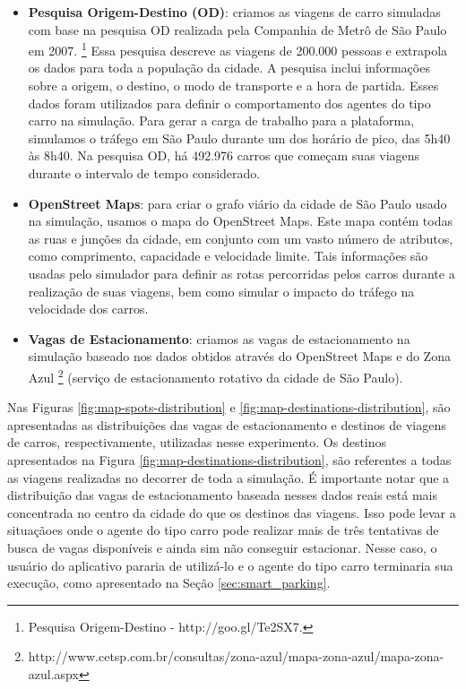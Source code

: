 \begin{itemize}
    \item \textbf{Pesquisa Origem-Destino (OD)}: criamos as viagens de carro simuladas com base na pesquisa OD realizada pela Companhia de Metrô de São Paulo em 2007.
        \footnote{Pesquisa Origem-Destino - http://goo.gl/Te2SX7.}
        Essa pesquisa descreve as viagens de 200.000 pessoas e extrapola os dados para toda a população da cidade.
        A pesquisa inclui informações sobre a origem, o destino, o modo de transporte e a hora de partida.
        Esses dados foram utilizados para definir o comportamento dos agentes do tipo carro na simulação.
        Para gerar a carga de trabalho para a plataforma, simulamos o tráfego em São Paulo durante um dos horário de pico, das 5h40 às 8h40.
        Na pesquisa OD, há 492.976 carros que começam suas viagens durante o intervalo de tempo considerado.

    \item \textbf{OpenStreet Maps}: para criar o grafo viário da cidade de São Paulo usado na simulação, usamos o mapa do OpenStreet Maps.
        Este mapa contém todas as ruas e junções da cidade, em conjunto com um vasto número de atributos, como comprimento, capacidade e velocidade limite.
        Tais informações são usadas pelo simulador para definir as rotas percorridas pelos carros durante a realização de suas viagens, bem como simular o impacto do tráfego na velocidade dos carros.

    \item \textbf{Vagas de Estacionamento}: criamos as vagas de estacionamento na simulação baseado nos dados obtidos através do OpenStreet Maps e do Zona Azul
        \footnote{http://www.cetsp.com.br/consultas/zona-azul/mapa-zona-azul/mapa-zona-azul.aspx}
        (serviço de estacionamento rotativo da cidade de São Paulo).
\end{itemize}

Nas Figuras \ref{fig:map-spots-distribution} e \ref{fig:map-destinations-distribution}, são apresentadas as distribuições das vagas de estacionamento e destinos de viagens de carros, respectivamente,
utilizadas nesse experimento.
Os destinos apresentados na Figura \ref{fig:map-destinations-distribution}, são referentes a todas as viagens realizadas no decorrer de toda a simulação.
É importante notar que a distribuição das vagas de estacionamento baseada nesses dados reais está mais concentrada no centro da cidade do que os destinos das viagens.
Isso pode levar a situaçãoes onde o agente do tipo carro pode realizar mais de três tentativas de busca de vagas disponíveis e ainda sim não conseguir estacionar.
Nesse caso, o usuário do aplicativo pararia de utilizá-lo e o agente do tipo carro terminaria sua execução, como apresentado na Seção \ref{sec:smart_parking}.

